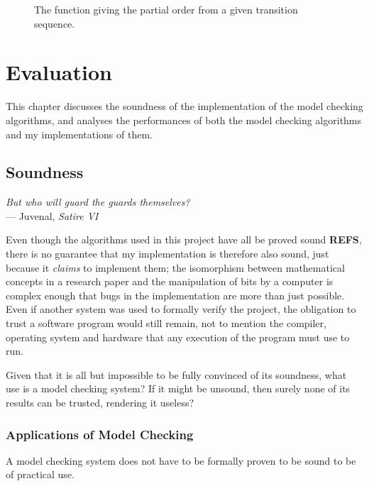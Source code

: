 \documentclass[12pt,a4paper,twoside,openright]{report}
\begin{document}
\begin{figure}	
	
	\caption{The function giving the partial order from
		a given transition sequence.}
\end{figure}

\chapter{Evaluation}

This chapter discusses the soundness
of the implementation of the model checking
algorithms, and analyses the performances
of both the model checking algorithms and
my implementations of them.

\section{Soundness}

\begin{center}
	\textit{But who will guard the guards themselves?} \\
	\qquad\qquad\qquad --- Juvenal, \textit{Satire VI}
\end{center}

Even though the algorithms
used in this project have all be proved sound \textbf{REFS},
there is no guarantee that my implementation
is therefore also sound, just because it
\emph{claims} to implement them; the isomorphism
between mathematical concepts in a research paper
and the manipulation of bits by a computer
is complex enough that bugs in the
implementation are more than just possible.
Even if another system was used to formally verify
the project, the obligation to trust
a software program would still remain,
not to mention the compiler, operating
system and hardware that any execution
of the program must use to run.

Given that it is all but impossible to
be fully convinced of its soundness,
what use is a model checking
system? If it might be unsound, then surely
none of its results can be trusted,
rendering it useless?

\subsection{Applications of Model Checking}
A model checking system does not have to be
formally proven to be sound to be of practical use.
\end{document}
